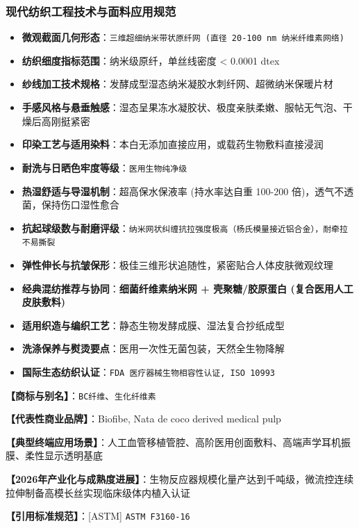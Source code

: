 \documentclass[11pt,openright,twoside,UTF8]{ctexbook}
\begin{document}
\subsubsection*{现代纺织工程技术与面料应用规范}
\begin{itemize} \setlength{\itemsep}{2pt}
    \item \textbf{微观截面几何形态}：\texttt{三维超细纳米带状原纤网 (直径 20-100 nm 纳米纤维素网络)}
    \item \textbf{纺织细度指标范围}：纳米级原纤，单丝线密度 \textless{} 0.0001 dtex
    \item \textbf{纱线加工技术规格}：发酵成型湿态纳米凝胶水刺纤网、超微纳米保暖片材
    \item \textbf{手感风格与悬垂触感}：湿态呈果冻水凝胶状、极度亲肤柔嫩、服帖无气泡、干燥后高刚挺紧密
    \item \textbf{印染工艺与适用染料}：本白无添加直接应用，或载药生物敷料直接浸润
    \item \textbf{耐洗与日晒色牢度等级}：\texttt{医用生物纯净级}
    \item \textbf{热湿舒适与导湿机制}：超高保水保液率 (持水率达自重 100-200 倍)，透气不透菌，保持伤口湿性愈合
    \item \textbf{抗起球级数与耐磨评级}：\texttt{纳米网状纠缠抗拉强度极高（杨氏模量接近铝合金），耐牵拉不易撕裂}
    \item \textbf{弹性伸长与抗皱保形}：极佳三维形状追随性，紧密贴合人体皮肤微观纹理
    \item \textbf{经典混纺推荐与协同}：\textbf{细菌纤维素纳米网 + 壳聚糖/胶原蛋白 (复合医用人工皮肤敷料)}
    \item \textbf{适用织造与编织工艺}：静态生物发酵成膜、湿法复合抄纸成型
    \item \textbf{洗涤保养与熨烫要点}：医用一次性无菌包装，天然全生物降解
    \item \textbf{国际生态纺织认证}：\texttt{FDA 医疗器械生物相容性认证, ISO 10993}
\end{itemize}
\vspace{0.2cm}

\noindent\textbf{【商标与别名】}：\texttt{BC纤维}、\texttt{生化纤维素}\par
\noindent\textbf{【代表性商业品牌】}：Biofibe, Nata de coco derived medical pulp\par
\noindent\textbf{【典型终端应用场景】}：人工血管移植管腔、高阶医用创面敷料、高端声学耳机振膜、柔性显示透明基底\par
\noindent\textbf{【2026年产业化与成熟度进展】}：生物反应器规模化量产达到千吨级，微流控连续拉伸制备高模长丝实现临床级体内植入认证\par
\noindent\textbf{【引用标准规范】}：[ASTM] \texttt{ASTM F3160-16}\par
\vspace{0.5cm}
\end{document}
